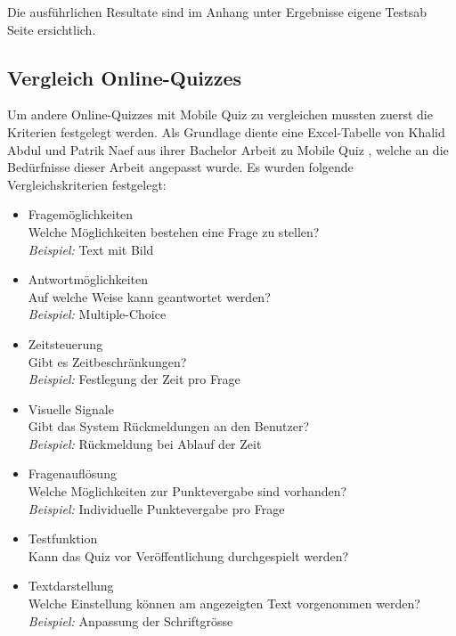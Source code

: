 	Die ausführlichen Resultate sind im Anhang unter \glqq Ergebnisse eigene Tests\grqq ab Seite \hyperlink{page.\getpagerefnumber{pdf:eigeneTests}}{} ersichtlich.	


	\subsection{Vergleich Online-Quizzes}
	\label{subsec:Webuntersuchungen}
	Um andere Online-Quizzes mit Mobile Quiz zu vergleichen mussten zuerst die Kriterien festgelegt werden. Als Grundlage diente eine Excel-Tabelle von Khalid Abdul und Patrik Naef aus ihrer Bachelor Arbeit zu Mobile Quiz \cite{khalid_bachelorarbeit_mobile_quiz_juni_2012.pdf_2012}, welche an die Bedürfnisse dieser Arbeit angepasst wurde. Es wurden folgende Vergleichskriterien festgelegt:
	\begin{itemize}
		\item Fragemöglichkeiten \\
		Welche Möglichkeiten bestehen eine Frage zu stellen? \\
		\textit{Beispiel:} Text mit Bild
		\item Antwortmöglichkeiten \\
		Auf welche Weise kann geantwortet werden? \\
		\textit{Beispiel:} Multiple-Choice
		\item Zeitsteuerung \\
		Gibt es Zeitbeschränkungen? \\
		\textit{Beispiel:} Festlegung der Zeit pro Frage
		\item Visuelle Signale \\
		Gibt das System Rückmeldungen an den Benutzer? \\
		\textit{Beispiel:} Rückmeldung bei Ablauf der Zeit
		\item Fragenauflösung \\
		Welche Möglichkeiten zur Punktevergabe sind vorhanden? \\
		\textit{Beispiel:} Individuelle Punktevergabe pro Frage
		\item Testfunktion \\
		Kann das Quiz vor Veröffentlichung durchgespielt werden? \\
		\item Textdarstellung \\
		Welche Einstellung können am angezeigten Text vorgenommen werden? \\
		\textit{Beispiel:} Anpassung der  Schriftgrösse

\end{itemize}
